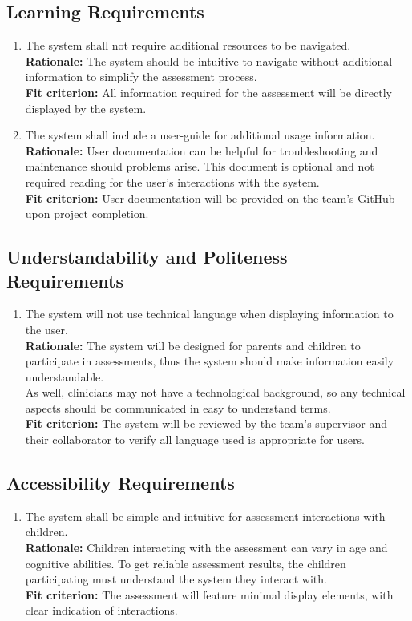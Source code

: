 \documentclass[12pt]{article}
\begin{document}
\subsection{Learning Requirements}
\begin{enumerate}[{UH-LI}1. ]
  \item The system shall not require additional resources to be navigated.\\
  \textbf{Rationale: }The system should be intuitive to navigate without additional information to simplify the assessment process.\\
  \textbf{Fit criterion: }All information required for the assessment will be directly displayed by the system.
  \item The system shall include a user-guide for additional usage information.\\
  \textbf{Rationale: }User documentation can be helpful for troubleshooting and maintenance should problems arise. This document is optional and not required reading for the user's interactions with the system.\\
  \textbf{Fit criterion: }User documentation will be provided on the team's GitHub upon project completion.
\end{enumerate}
\subsection{Understandability and Politeness Requirements}
\begin{enumerate}[{UH-UP}1. ]
  \item The system will not use technical language when displaying information to the user.\\
  \textbf{Rationale: }The system will be designed for parents and children to participate in assessments, thus the system should make information easily understandable.\\
  As well, clinicians may not have a technological background, so any technical aspects should be communicated in easy to understand terms.\\
  \textbf{Fit criterion: }The system will be reviewed by the team's supervisor and their collaborator to verify all language used is appropriate for users.
\end{enumerate}
\subsection{Accessibility Requirements}
\begin{enumerate}[{UH-AR}1. ]
  \item The system shall be simple and intuitive for assessment interactions with children.\\
  \textbf{Rationale: }Children interacting with the assessment can vary in age and cognitive abilities. To get reliable assessment results, the children participating must understand the system they interact with.\\
  \textbf{Fit criterion: }The assessment will feature minimal display elements, with clear indication of interactions.
\end{enumerate}
\end{document}
